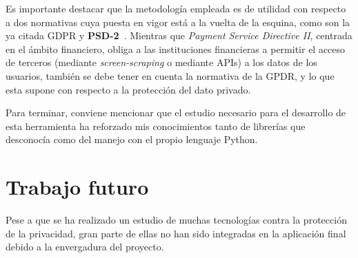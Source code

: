 Es importante destacar que la metodología empleada es de utilidad con 
respecto a dos normativas cuya puesta en vigor está a la vuelta de la 
esquina, como son la ya citada GDPR y \textbf{PSD-2}~\cite{article:psd2}.
Mientras que \textit{Payment Service Directive II}, centrada en el ámbito 
financiero, obliga a las instituciones financieras a permitir el acceso de 
terceros (mediante \textit{screen-scraping} o mediante APIs) a los datos de los usuarios, también se debe tener en cuenta la normativa de la GPDR, y lo que esta 
supone con respecto a la protección del dato privado.

Para terminar, conviene mencionar que el estudio necesario para el
desarrollo de esta herramienta ha reforzado mis conocimientos tanto de
librerías que desconocía como del manejo con el propio lenguaje
Python.

\section{Trabajo futuro}

Pese a que se ha realizado un estudio de muchas tecnologías contra la protección de la privacidad, gran parte de ellas no han sido integradas en la aplicación final debido a la envergadura del proyecto.

